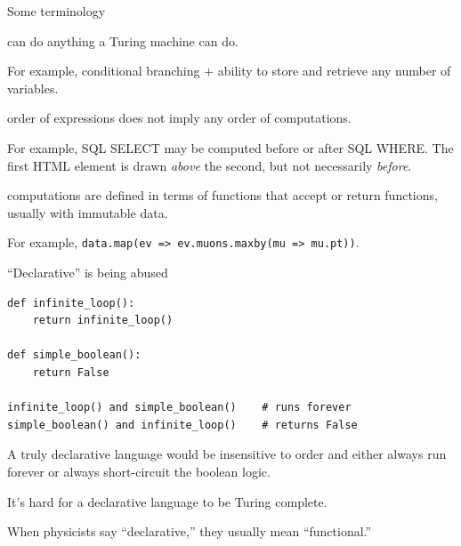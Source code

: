 \documentclass[aspectratio=169]{beamer}
\begin{document}
\begin{frame}{Some terminology}
\large
\vspace{0.5 cm}
\begin{description}\setlength{\itemsep}{0.5 cm}
\item[Turing complete:] can do anything a Turing machine can do.

\vspace{0.25 cm}
{\normalsize For example, conditional branching $+$ ability to store and retrieve any number of variables.}

\item[Declarative:] order of expressions does not imply any order of computations.

\vspace{0.25 cm}
{\normalsize For example, SQL SELECT may be computed before or after SQL WHERE. The first HTML element is drawn {\it above} the second, but not necessarily {\it before}.}

\item[Functional:] computations are defined in terms of functions that accept or return functions, usually with immutable data.

\vspace{0.25 cm}
{\normalsize For example, \small\texttt{data.map(ev => ev.muons.maxby(mu => mu.pt))}\normalsize .}
\end{description}
\end{frame}

\begin{frame}[fragile]{``Declarative'' is being abused}
\small
\vspace{0.25 cm}
\begin{verbatim}
def infinite_loop():
    return infinite_loop()

def simple_boolean():
    return False

infinite_loop() and simple_boolean()    # runs forever
simple_boolean() and infinite_loop()    # returns False
\end{verbatim}

\normalsize
\vspace{0.25 cm}
A truly declarative language would be insensitive to order and either always run forever or always short-circuit the boolean logic.

\vspace{0.5 cm}
It's hard for a declarative language to be Turing complete.

\vspace{0.5 cm}
When physicists say ``declarative,'' they usually mean ``functional.'' 
\end{frame}
\end{document}
